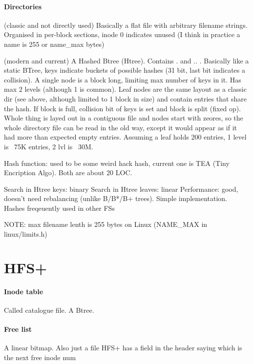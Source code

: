 \documentclass[a4paper]{report}
\begin{document}
        \paragraph{Directories} (classic and not directly used) Basically a flat file
        with arbitrary filename strings. Organised in per-block sections, inode
        0 indicates unused (I think in practice a name is 255 or name\_max bytes)

        (modern and current) A Hashed Btree (Htree). Contains . and .. .
        Basically like a static BTree, keys indicate buckets of possible hashes
        (31 bit, last bit indicates a collision). A single node is a block
        long, limiting max number of keys in it. Has max 2 levels (although 1
        is common). Leaf nodes are the same layout as a classic dir (see above,
        although limited to 1 block in size) and contain entries that share the
        hash. If block is full, collision bit of keys is set and block is split
        (fixed op). Whole thing is layed out in a contiguous file and nodes
        start with zeores, so the whole directory file can be read in the old
        way, except it would appear as if it had more than expected empty
        entries.  Assuming a leaf holds 200 entries, 1 level is ~75K entries, 2
        lvl is ~30M.

        Hash function: used to be some weird hack hash, current one is TEA
        (Tiny Encription Algo). Both are about 20 LOC.

        Search in Htree keys: binary
        Search in Htree leaves: linear
        Performance: good, doesn't need rebalancing (unlike B/B*/B+ trees).
            Simple implementation. Hashes freqeuently used in other FSs


        NOTE: max filename lenth is 255 bytes on Linux (NAME\_MAX in linux/limits.h)

    \section{HFS+}
        \paragraph{Inode table} Called catalogue file. A Btree.
        \paragraph{Free list} A linear bitmap. Also just a file
        HFS+ has a field in the header saying which is the next free inode num
\end{document}
